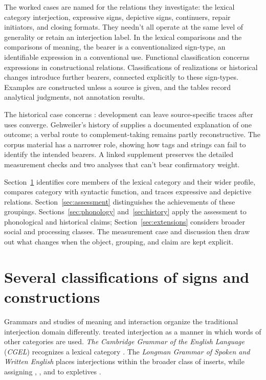 \documentclass[12pt]{article}
\begin{document}
The worked cases are named for the relations they investigate: the
lexical category interjection, expressive signs, depictive signs, continuers, repair
initiators, and closing formats. They needn't all operate at the same level
of generality or retain an interjection label. In the lexical comparisons
and the comparisons of meaning, the bearer is a conventionalized sign-type,
an identifiable expression in a conventional use. Functional classification
concerns expressions in constructional relations. Classifications of
realizations or historical changes introduce further bearers, connected
explicitly to these sign-types. Examples are constructed unless a source is
given, and the tables record analytical judgments, not annotation results.

The historical case concerns : development can leave
source-specific traces after uses converge. Gehweiler's history of
 supplies a documented explanation of one outcome; a verbal
route to complement-taking  remains partly reconstructive.
The corpus material has a narrower role, showing how tags and strings
can fail to identify the intended bearers. A linked supplement preserves
the detailed measurement checks and two analyses that can't bear
confirmatory weight.

Section~\ref{sec:worked} identifies core members of the lexical category
and their wider profile,
compares category with syntactic function, and traces expressive and depictive
relations. Section~\ref{sec:assessment} distinguishes the achievements
of these groupings. Sections~\ref{sec:phonology} and~\ref{sec:history}
apply the assessment to phonological and historical claims;
Section~\ref{sec:extensions} considers broader social and processing
classes. The measurement case and discussion then draw out what changes
when the object, grouping, and claim are kept explicit.

\section{Several classifications of signs and constructions}\label{sec:worked}

Grammars and studies of meaning and interaction organize the traditional
interjection domain differently. \textcite[90]{jespersen1924} treated
interjection as a manner in which words of other categories are used.
\textit{The Cambridge Grammar of the English Language} (\textit{CGEL})
recognizes a lexical category \citep[22]{HuddlestonPullum2002}. The
\textit{Longman Grammar of Spoken and Written English} places interjections
within the broader class of inserts, while assigning ,
, and  to expletives
\citep[1082--1083, 1094--1095]{Biber1999}.
\end{document}
